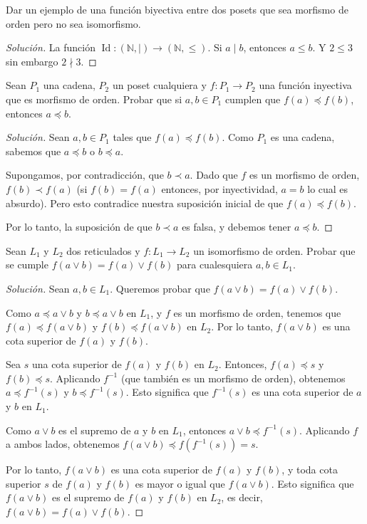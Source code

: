 \begin{exercise}[8]
    Dar un ejemplo de una función biyectiva entre dos posets que sea morfismo de orden pero no sea isomorfismo.
\end{exercise}

\begin{proof}[Solución]
    La función $\operatorname{Id}: (\mathbb{N}, \mid ) \to (\mathbb{N}, \leq )$. Si $a \mid b$, entonces $a \leq b$. Y $2 \leq 3$ sin embargo $2 \nmid 3$.
\end{proof}

\begin{exercise}[9]
    Sean $P_1$ una cadena, $P_2$ un poset cualquiera y $f: P_1 \to P_2$ una función inyectiva que es morfismo de orden. Probar que si $a, b \in P_1$ cumplen que $f(a) \preceq f(b)$, entonces $a \preceq b$.
\end{exercise}
    
\begin{proof}[Solución]
    Sean $a, b \in P_1$ tales que $f(a) \preceq f(b)$. Como $P_1$ es una cadena, sabemos que $a \preceq b$ o $b \preceq a$. 

    Supongamos, por contradicción, que $b \prec a$. Dado que $f$ es un morfismo de orden, $f(b) \prec f(a)$ (si $f(b) = f(a)$ entonces, por inyectividad, $a = b$ lo cual es absurdo). Pero esto contradice nuestra suposición inicial de que $f(a) \preceq f(b)$.

    Por lo tanto, la suposición de que $b \prec a$ es falsa, y debemos tener $a \preceq b$.
\end{proof}
    
\begin{exercise}[10]
    Sean $L_1$ y $L_2$ dos reticulados y $f: L_1 \to L_2$ un isomorfismo de orden. Probar que se cumple $f(a \vee b) = f(a) \vee f(b)$ para cualesquiera $a, b \in L_1$.
\end{exercise}

\begin{proof}[Solución]
    Sean $a, b \in L_1$. Queremos probar que $f(a \vee b) = f(a) \vee f(b)$.

    Como $a \preceq a \vee b$ y $b \preceq a \vee b$ en $L_1$, y $f$ es un morfismo de orden, tenemos que $f(a) \preceq f(a \vee b)$ y $f(b) \preceq f(a \vee b)$ en $L_2$. Por lo tanto, $f(a \vee b)$ es una cota superior de $f(a)$ y $f(b)$.

    Sea $s$ una cota superior de $f(a)$ y $f(b)$ en $L_2$. Entonces, $f(a) \preceq s$ y $f(b) \preceq s$. Aplicando $f^{-1}$ (que también es un morfismo de orden), obtenemos $a \preceq f^{-1}(s)$ y $b \preceq f^{-1}(s)$. Esto significa que $f^{-1}(s)$ es una cota superior de $a$ y $b$ en $L_1$.

    Como $a \vee b$ es el supremo de $a$ y $b$ en $L_1$, entonces $a \vee b \preceq f^{-1}(s)$. Aplicando $f$ a ambos lados, obtenemos $f(a \vee b) \preceq f(f^{-1}(s)) = s$.

    Por lo tanto, $f(a \vee b)$ es una cota superior de $f(a)$ y $f(b)$, y toda cota superior $s$ de $f(a)$ y $f(b)$ es mayor o igual que $f(a \vee b)$. Esto significa que $f(a \vee b)$ es el supremo de $f(a)$ y $f(b)$ en $L_2$, es decir, $f(a \vee b) = f(a) \vee f(b)$.
\end{proof}

